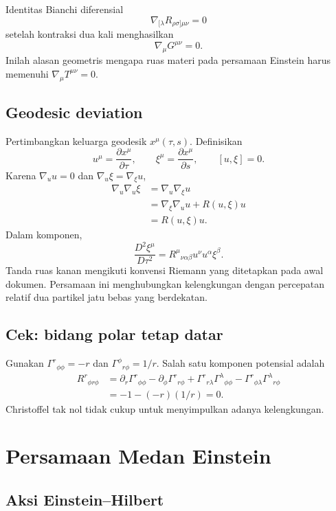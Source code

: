 \documentclass[12pt,a4paper]{report}
\newcommand{\pd}{\partial}
\begin{document}
Identitas Bianchi diferensial
\[
 \nabla_{[\lambda}R_{\rho\sigma]\mu\nu}=0
\]
setelah kontraksi dua kali menghasilkan
\[
 \boxed{\nabla_\mu G^{\mu\nu}=0}.
\]
Inilah alasan geometris mengapa ruas materi pada persamaan Einstein harus memenuhi
$\nabla_\mu T^{\mu\nu}=0$.

\section{Geodesic deviation}

Pertimbangkan keluarga geodesik $x^\mu(\tau,s)$. Definisikan
\[
 u^\mu=\frac{\pd x^\mu}{\pd\tau},
 \qquad \xi^\mu=\frac{\pd x^\mu}{\pd s},
 \qquad [u,\xi]=0.
\]
Karena $\nabla_u u=0$ dan $\nabla_u\xi=\nabla_\xi u$,
\begin{align}
 \nabla_u\nabla_u\xi
 &=\nabla_u\nabla_\xi u\\
 &=\nabla_\xi\nabla_u u+R(u,\xi)u\\
 &=R(u,\xi)u.
\end{align}
Dalam komponen,
\[
 \boxed{
 \frac{D^2\xi^\mu}{D\tau^2}
 =R^\mu{}_{\nu\alpha\beta}u^\nu u^\alpha\xi^\beta}.
\]
Tanda ruas kanan mengikuti konvensi Riemann yang ditetapkan pada awal dokumen.
Persamaan ini menghubungkan kelengkungan dengan percepatan relatif dua partikel
jatu bebas yang berdekatan.

\section{Cek: bidang polar tetap datar}

Gunakan $\Gamma^r{}_{\phi\phi}=-r$ dan
$\Gamma^\phi{}_{r\phi}=1/r$. Salah satu komponen potensial adalah
\begin{align}
 R^r{}_{\phi r\phi}
 &=\pd_r\Gamma^r{}_{\phi\phi}
 -\pd_\phi\Gamma^r{}_{r\phi}
 +\Gamma^r{}_{r\lambda}\Gamma^\lambda{}_{\phi\phi}
 -\Gamma^r{}_{\phi\lambda}\Gamma^\lambda{}_{r\phi}\\
 &=-1-(-r)(1/r)=0.
\end{align}
Christoffel tak nol tidak cukup untuk menyimpulkan adanya kelengkungan.

\chapter{Persamaan Medan Einstein}

\section{Aksi Einstein--Hilbert}
\end{document}
